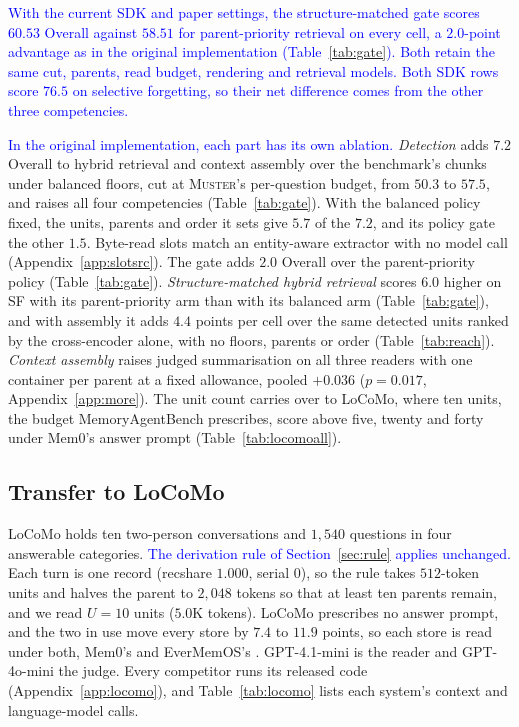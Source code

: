 \documentclass{article}
\newcommand{\nativechange}[1]{\textcolor{blue}{#1}}
\newcommand{\sys}{\textsc{Muster}}
\newcommand{\serial}{\textsf{serial}}
\newcommand{\cov}{\textsf{recshare}}
\begin{document}
\nativechange{With the current SDK and paper settings, the structure-matched gate scores $60.53$ Overall against $58.51$ for parent-priority retrieval on every cell, a $2.0$-point advantage as in the original implementation (Table~\ref{tab:gate}). Both retain the same cut, parents, read budget, rendering and retrieval models. Both SDK rows score $76.5$ on selective forgetting, so their net difference comes from the other three competencies.}

\nativechange{In the original implementation, each part has its own ablation.} \emph{Detection} adds $7.2$ Overall to hybrid retrieval and context assembly over the benchmark's chunks under balanced floors, cut at \sys{}'s per-question budget, from $50.3$ to $57.5$, and raises all four competencies (Table~\ref{tab:gate}). With the balanced policy fixed, the units, parents and order it sets give $5.7$ of the $7.2$, and its policy gate the other $1.5$. Byte-read slots match an entity-aware extractor with no model call (Appendix~\ref{app:slotsrc}). The gate adds $2.0$ Overall over the parent-priority policy (Table~\ref{tab:gate}). \emph{Structure-matched hybrid retrieval} scores $6.0$ higher on SF with its parent-priority arm than with its balanced arm (Table~\ref{tab:gate}), and with assembly it adds $4.4$ points per cell over the same detected units ranked by the cross-encoder alone, with no floors, parents or order (Table~\ref{tab:reach}). \emph{Context assembly} raises judged summarisation on all three readers with one container per parent at a fixed allowance, pooled $+0.036$ ($p=0.017$, Appendix~\ref{app:more}). The unit count carries over to LoCoMo, where ten units, the budget MemoryAgentBench prescribes, score above five, twenty and forty under Mem0's answer prompt (Table~\ref{tab:locomoall}).

\subsection{Transfer to LoCoMo}\label{sec:locomo}

LoCoMo \cite{locomo} holds ten two-person conversations and $1{,}540$ questions in four answerable categories. \nativechange{The derivation rule of Section~\ref{sec:rule} applies unchanged.} Each turn is one record (\cov{} $1.000$, \serial{} $0$), so the rule takes $512$-token units and halves the parent to $2{,}048$ tokens so that at least ten parents remain, and we read $U{=}10$ units ($5.0$K tokens). LoCoMo prescribes no answer prompt, and the two in use move every store by $7.4$ to $11.9$ points, so each store is read under both, Mem0's \cite{mem0} and EverMemOS's \cite{evermemos}. GPT-4.1-mini \cite{gpt41} is the reader and GPT-4o-mini \cite{gpt4omini} the judge. Every competitor runs its released code (Appendix~\ref{app:locomo}), and Table~\ref{tab:locomo} lists each system's context and language-model calls.
\end{document}
